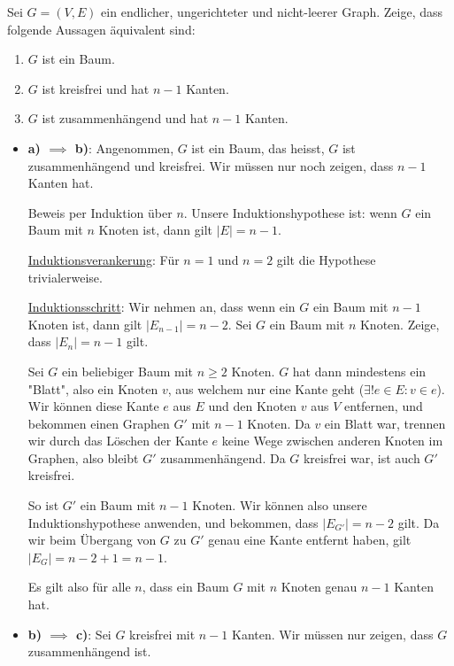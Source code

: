 \documentclass[12pt]{article}
\begin{document}
\begin{problem}{}{}
    Sei $G = (V, E)$ ein endlicher, ungerichteter und nicht-leerer Graph. Zeige, dass folgende Aussagen äquivalent sind:
    \begin{enumerate}[label=\alph*)]
        \item $G$ ist ein Baum.
        \item $G$ ist kreisfrei und hat $n-1$ Kanten.
        \item $G$ ist zusammenhängend und hat $n-1$ Kanten.
    \end{enumerate}
\end{problem}

\begin{itemize}
    \item \textbf{a) $\implies$ b)}: Angenommen, $G$ ist ein Baum, das heisst, $G$ ist zusammenhängend und kreisfrei. Wir müssen nur noch zeigen, dass $n-1$ Kanten hat.
    
    Beweis per Induktion über $n$. Unsere Induktionshypothese ist: wenn $G$ ein Baum mit $n$ Knoten ist, dann gilt $|E| = n - 1$.

    \underline{Induktionsverankerung}: Für $n = 1$ und $n = 2$ gilt die Hypothese trivialerweise.

    \underline{Induktionsschritt}: Wir nehmen an, dass wenn ein $G$ ein Baum mit $n - 1$ Knoten ist, dann gilt $|E_{n-1}| = n - 2$. Sei $G$ ein Baum mit $n$ Knoten. Zeige, dass $|E_n| = n-1$ gilt.
    
    Sei $G$ ein beliebiger Baum mit $n \geq 2$ Knoten. $G$ hat dann mindestens ein "Blatt", also ein Knoten $v$, aus welchem nur eine Kante geht ($\exists! e \in E : v \in e$). Wir können diese Kante $e$ aus $E$ und den Knoten $v$ aus $V$ entfernen, und bekommen einen Graphen $G'$ mit $n-1$ Knoten. Da $v$ ein Blatt war, trennen wir durch das Löschen der Kante $e$ keine Wege zwischen anderen Knoten im Graphen, also bleibt $G'$ zusammenhängend. Da $G$ kreisfrei war, ist auch $G'$ kreisfrei.

    So ist $G'$ ein Baum mit $n-1$ Knoten. Wir können also unsere Induktionshypothese anwenden, und bekommen, dass $|E_{G'}| = n - 2$ gilt. Da wir beim Übergang von $G$ zu $G'$ genau eine Kante entfernt haben, gilt $|E_G| = n-2+1 = n-1$.

    Es gilt also für alle $n$, dass ein Baum $G$ mit $n$ Knoten genau $n-1$ Kanten hat.

    \item \textbf{b) $\implies$ c)}: Sei $G$ kreisfrei mit $n-1$ Kanten. Wir müssen nur zeigen, dass $G$ zusammenhängend ist.
    

\end{itemize}
\end{document}
